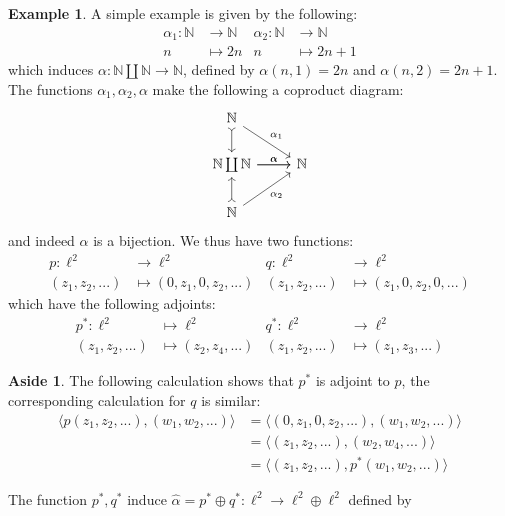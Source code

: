\documentclass[12pt]{article}
\theoremstyle{plain}
\theoremstyle{definition}
\newtheorem{example}[thm]{Example}
\newtheorem{aside}[thm]{Aside}
\newcommand{\bb}[1]{\mathbb{#1}}
\newcommand{\lto}{\longrightarrow}
\begin{document}
	\begin{example}
		A simple example is given by the following:
		\begin{align*}
			\alpha_1: \bb{N} &\lto \bb{N} & \alpha_2: \bb{N} &\lto \bb{N}\\
			n &\longmapsto 2n & n &\longmapsto 2n + 1
		\end{align*}
		which induces $\alpha: \bb{N} \coprod \bb{N} \lto \bb{N}$, defined by $\alpha(n,1) = 2n$ and $\alpha(n,2) = 2n+1$. The functions $\alpha_1,\alpha_2,\alpha$ make the following a coproduct diagram:
		\begin{equation}
			\begin{tikzcd}
				\bb{N}\arrow[dr,"{\alpha_1}"]\arrow[d,rightarrowtail]\\
				\bb{N}\arrow[r,"{\alpha}"] \coprod \bb{N}\arrow[r,"{\alpha}"] & \bb{N}\\
				\bb{N}\arrow[ur,swap,"{\alpha_2}"]\arrow[u,rightarrowtail]
			\end{tikzcd}
		\end{equation}
		and indeed $\alpha$ is a bijection. We thus have two functions:
		\begin{align*}
			p: \ell^2 & \lto \ell^2 & q: \ell^2 &\lto \ell^2\\
			(z_1,z_2,...) &\longmapsto (0, z_1, 0, z_2, ...) & (z_1,z_2,...) &\longmapsto (z_1, 0, z_2, 0, ...)
		\end{align*}
		which have the following adjoints:
		\begin{align*}
			p^\ast: \ell^2 &\longmapsto \ell^2 & q^\ast: \ell^2 &\lto \ell^2\\
			(z_1,z_2,...) &\longmapsto (z_2,z_4,...) & (z_1,z_2,...) &\longmapsto (z_1,z_3,...)
		\end{align*}
		\begin{aside}
			The following calculation shows that $p^\ast$ is adjoint to $p$, the corresponding calculation for $q$ is similar:
			\begin{align*}
				\big\langle p(z_1,z_2,...),(w_1,w_2,...)\big\rangle &= \big\langle (0,z_1,0,z_2,...),(w_1,w_2,...)\big\rangle\\
				&= \big\langle (z_1,z_2,...),(w_2,w_4,...)\big\rangle\\
				&= \big\langle (z_1,z_2,...),p^\ast(w_1,w_2,...)\big\rangle
			\end{align*}
		\end{aside}
		The function $p^\ast,q^\ast$ induce $\hat{\alpha} = p^\ast \oplus q^\ast: \ell^2 \lto \ell^2 \oplus \ell^2$ defined by
		\begin{equation}

\end{equation}
\end{example}
\end{document}
